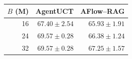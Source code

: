 \begin{tabular}{@{}rrr@{}}
\toprule
$B$ (M) & AgentUCT & AFlow--RAG\\
\midrule
16 & $67.40\pm2.54$ & $65.93\pm1.91$\\
24 & $69.57\pm0.28$ & $66.38\pm1.24$\\
32 & $69.57\pm0.28$ & $67.25\pm1.57$\\
\bottomrule
\end{tabular}
